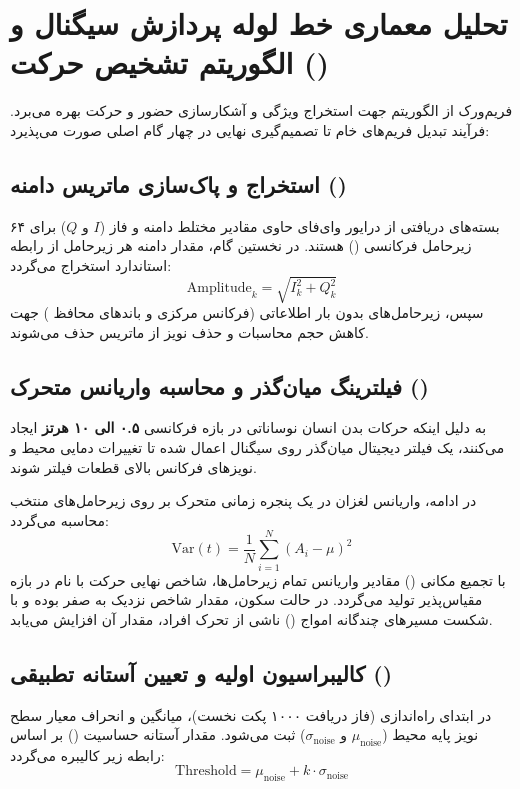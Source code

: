 \documentclass[12pt,a4paper]{article}
\begin{document}
\section{تحلیل معماری خط لوله پردازش سیگنال و الگوریتم تشخیص حرکت ()}
فریم‌ورک  از الگوریتم \textbf{} جهت استخراج ویژگی و آشکارسازی حضور و حرکت بهره می‌برد. فرآیند تبدیل فریم‌های خام تا تصمیم‌گیری نهایی در چهار گام اصلی صورت می‌پذیرد:

\subsection{استخراج و پاک‌سازی ماتریس دامنه ()}
بسته‌های دریافتی از درایور وای‌فای حاوی مقادیر مختلط دامنه و فاز ($I$ و $Q$) برای ۶۴ زیرحامل فرکانسی () هستند. در نخستین گام، مقدار دامنه هر زیرحامل از رابطه استاندارد استخراج می‌گردد:
\begin{equation}
\text{Amplitude}_k = \sqrt{I_k^2 + Q_k^2}
\end{equation}
سپس، زیرحامل‌های بدون بار اطلاعاتی (فرکانس مرکزی  و باندهای محافظ ) جهت کاهش حجم محاسبات و حذف نویز از ماتریس حذف می‌شوند.

\subsection{فیلترینگ میان‌گذر و محاسبه واریانس متحرک ()}
به دلیل اینکه حرکات بدن انسان نوساناتی در بازه فرکانسی \textbf{۰.۵ الی ۱۰ هرتز} ایجاد می‌کنند، یک فیلتر دیجیتال میان‌گذر روی سیگنال اعمال شده تا تغییرات دمایی محیط و نویزهای فرکانس بالای قطعات فیلتر شوند. 

در ادامه، واریانس لغزان در یک پنجره زمانی متحرک بر روی زیرحامل‌های منتخب محاسبه می‌گردد:
\begin{equation}
\text{Var}(t) = \frac{1}{N} \sum_{i=1}^{N} \left( A_i - \mu \right)^2
\end{equation}
با تجمیع مکانی () مقادیر واریانس تمام زیرحامل‌ها، شاخص نهایی حرکت با نام \textbf{} در بازه مقیاس‌پذیر تولید می‌گردد. در حالت سکون، مقدار شاخص نزدیک به صفر بوده و با شکست مسیرهای چندگانه امواج () ناشی از تحرک افراد، مقدار آن افزایش می‌یابد.

\subsection{کالیبراسیون اولیه و تعیین آستانه تطبیقی ()}
در ابتدای راه‌اندازی (فاز دریافت ۱۰۰۰ پکت نخست)، میانگین و انحراف معیار سطح نویز پایه محیط ($\mu_{\text{noise}}$ و $\sigma_{\text{noise}}$) ثبت می‌شود. مقدار آستانه حساسیت (\textbf{}) بر اساس رابطه زیر کالیبره می‌گردد:
\begin{equation}
\text{Threshold} = \mu_{\text{noise}} + k \cdot \sigma_{\text{noise}}
\end{equation}
\end{document}
